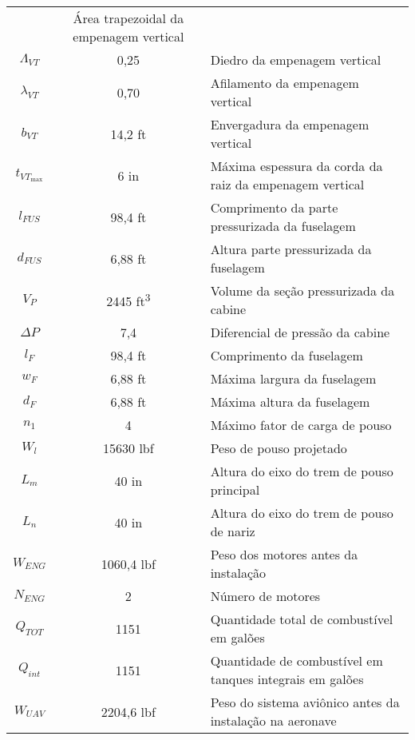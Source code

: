 \begin{table}[h]
\begin{tabular}{ccl}
				& Área trapezoidal da empenagem vertical
			\\
			$ \Lambda_{VT} $
				& 0,25
				& Diedro da empenagem vertical
			\\
			$ \lambda_{VT} $
				& 0,70
				& Afilamento da empenagem vertical
			\\
			$ b_{VT} $
				& 14,2 \si{ft}
				& Envergadura da empenagem vertical
			\\
			$ t_{VT_{\max}} $
				& 6 \si{in}
				& Máxima espessura da corda da raiz da empenagem vertical
			\\
			$ l_{FUS} $
				& 98,4 \si{ft}
				& Comprimento da parte pressurizada da fuselagem
			\\
			$ d_{FUS} $
				& 6,88 \si{ft}
				& Altura parte pressurizada da fuselagem
			\\
			$ V_P $
				& 2445 \si{ft^3}
				& Volume da seção pressurizada da cabine
			\\
			$ \Delta P $
				& 7,4
				& Diferencial de pressão da cabine
			\\
			$ l_F $
				& 98,4 \si{ft}
				& Comprimento da fuselagem
			\\
			$ w_F $
				& 6,88 \si{ft}
				& Máxima largura da fuselagem
			\\
			$ d_F $
				& 6,88 \si{ft}
				& Máxima altura da fuselagem
			\\
			$ n_1 $
				& 4
				& Máximo fator de carga de pouso
			\\
			$ W_l $
				& 15630 \si{lbf}
				& Peso de pouso projetado
			\\
			$ L_m $
				& 40 \si{in}
				& Altura do eixo do trem de pouso principal
			\\
			$ L_n $
				& 40 \si{in}
				& Altura do eixo do trem de pouso de nariz
			\\
			$ W_{ENG} $
				& 1060,4 \si{lbf}
				& Peso dos motores antes da instalação
			\\
			$ N_{ENG} $
				& 2
				& Número de motores
			\\
			$ Q_{TOT} $
				& 1151
				& Quantidade total de combustível em galões
			\\
			$ Q_{int} $
				& 1151
				& Quantidade de combustível em tanques integrais em galões
			\\
			$ W_{UAV} $
				& 2204,6 \si{lbf}
				& Peso do sistema aviônico antes da instalação na aeronave
			\\ \hline
    \end{tabular}
  \end{table}

